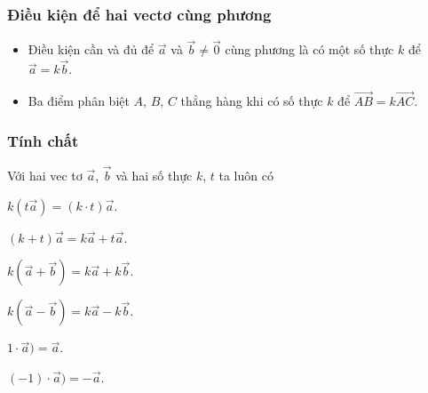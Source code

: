 \subsubsection{Điều kiện để hai vectơ cùng phương}
\begin{khung4}{}
	\begin{itemize}
		\item [\ding{172}] Điều kiện cần và đủ để $\overrightarrow{a}$ và $\overrightarrow{b} \ne \overrightarrow{0}$ cùng phương là có một số thực $k$ để $\overrightarrow{a}=k\overrightarrow{b}$.
		\item [\ding{173}] Ba điểm phân biệt $A$, $B$, $C$ thẳng hàng khi có số thực $k$ để $\overrightarrow{AB}=k\overrightarrow{AC}$.
	\end{itemize}
\end{khung4}
\subsubsection{Tính chất}
\begin{tcolorbox}[colframe=orange,colback=white,boxrule=0.2mm]
	Với hai vec tơ $\vec{a}$, $\vec{b}$ và hai số thực $k$, $t$ ta luôn có
	\begin{listEX}[3]
		\item [$\bullet$] $k(t\vec{a})=(k \cdot t)\vec{a}$.
		\item [$\bullet$] $(k+t)\vec{a}=k\vec{a}+t\vec{a}$.
		\item [$\bullet$] $k(\vec{a}+\vec{b})=k\vec{a}+k\vec{b}$.
		\item [$\bullet$] $k(\vec{a}-\vec{b})=k\vec{a}-k\vec{b}$.
		\item [$\bullet$] $1\cdot \vec{a})=\vec{a}$. 
		\item [$\bullet$] $(-1)\cdot \vec{a})=-\vec{a}$.
	\end{listEX}
\end{tcolorbox}
